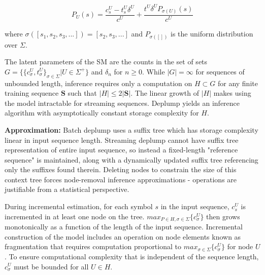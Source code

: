 \begin{equation}
P_{U}(s)=\frac{c_{s}^{U}-t_{s}^{U}\delta^{U}}{c^{U}}+\frac{t^{U}\delta^{U}P_{\sigma(U)}(s)}{c^{U}}
\label{eq:deplumpReview}
\end{equation}

\noindent where $\sigma([s_{1}, s_{2}, s_{3}, ...])=[s_{2}, s_{3}, ...]$ and $P_{\sigma([])}$ is the uniform distribution over $\Sigma$.

The latent parameters of the SM are the counts in the set of sets $G=\{\{c_{\sigma}^{U}, t_{\sigma}^{U}\}_{\sigma\in\Sigma}|U\in\Sigma^{+}\}$ and $\delta_{n}$ for $n\geq 0$. While $|G|=\infty$ for sequences of unbounded length, inference requires only a computation on $H\subset G$ for any finite training sequence $\boldsymbol S$ such that $|H|\leq 2|\boldsymbol S |$. The linear growth of $|H|$ makes using the model intractable for streaming sequences. Deplump yields an inference algorithm with asymptotically constant storage complexity for $H$.

\textbf{Approximation:} Batch deplump uses a suffix tree which has storage complexity linear in input sequence length. Streaming deplump cannot have suffix tree representation of entire input sequence, so instead a fixed-length "reference sequence" is maintained, along with a dynamically updated suffix tree referencing only the suffixes found therein. Deleting nodes to constrain the size of this context tree forces node-removal inference approximations - operations are justifiable from a statistical perspective.

During incremental estimation, for each symbol $s$ in the input sequence, $c_{s}^{U}$ is incremented in at least one node on the tree. $max_{P\in H, \sigma\in\Sigma}\{c_{\sigma}^{U}\}$ then grows monotonically as a function of the length of the input sequence. Incremental construction of the model includes an operation on node elements known as fragmentation that requires computation proportional to $max_{\sigma\in\Sigma}\{c_{\sigma}^{U}\}$ for node $U$. To ensure computational complexity that is independent of the sequence length, $c_{\sigma}^{U}$ must be bounded for all $U\in H$.

